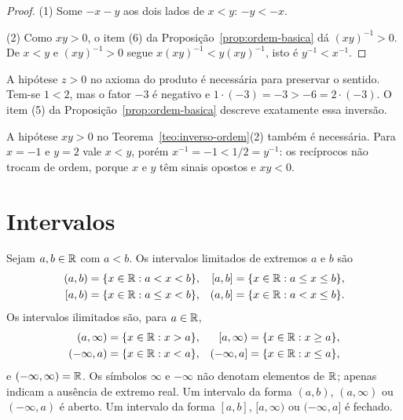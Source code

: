 \documentclass[11pt,a4paper]{article}
\begin{document}
\begin{proof}
(1) Some $-x-y$ aos dois lados de $x<y$: $-y<-x$.

(2) Como $xy>0$, o item (6) da Proposição~\ref{prop:ordem-basica} dá $(xy)^{-1}>0$. De $x<y$ e $(xy)^{-1}>0$ segue $x(xy)^{-1}<y(xy)^{-1}$, isto é $y^{-1}<x^{-1}$.
\end{proof}

\begin{contraexemplo}
A hipótese $z>0$ no axioma do produto é necessária para preservar o sentido. Tem-se $1<2$, mas o fator $-3$ é negativo e $1\cdot(-3)=-3> -6=2\cdot(-3)$. O item (5) da Proposição~\ref{prop:ordem-basica} descreve exatamente essa inversão.

A hipótese $xy>0$ no Teorema~\ref{teo:inverso-ordem}(2) também é necessária. Para $x=-1$ e $y=2$ vale $x<y$, porém $x^{-1}=-1<1/2=y^{-1}$: os recíprocos não trocam de ordem, porque $x$ e $y$ têm sinais opostos e $xy<0$.
\end{contraexemplo}


\section{Intervalos}

\begin{definicao}
Sejam $a,b\in\mathbb{R}$ com $a<b$. Os intervalos limitados de extremos $a$ e $b$ são
\begin{align*}
(a,b)&=\{x\in\R:a<x<b\},&
[a,b]&=\{x\in\R:a\le x\le b\},\\
[a,b)&=\{x\in\R:a\le x<b\},&
(a,b]&=\{x\in\R:a<x\le b\}.
\end{align*}
Os intervalos ilimitados são, para $a\in\mathbb{R}$,
\begin{align*}
(a,\infty)&=\{x\in\mathbb{R}:x>a\},&
[a,\infty)&=\{x\in\mathbb{R}:x\ge a\},\\
(-\infty,a)&=\{x\in\mathbb{R}:x<a\},&
(-\infty,a]&=\{x\in\mathbb{R}:x\le a\},
\end{align*}
e $(-\infty,\infty)=\mathbb{R}$. Os símbolos $\infty$ e $-\infty$ não denotam elementos de $\mathbb{R}$; apenas indicam a ausência de extremo real. Um intervalo da forma $(a,b)$, $(a,\infty)$ ou $(-\infty,a)$ é aberto. Um intervalo da forma $[a,b]$, $[a,\infty)$ ou $(-\infty,a]$ é fechado.
\end{definicao}
\end{document}

